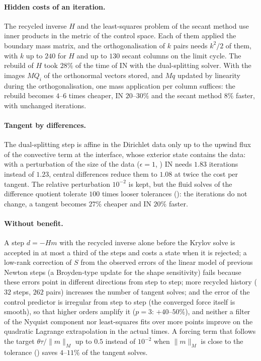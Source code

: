 \documentclass[11pt,a4paper]{article}
\theoremstyle{definition}
\theoremstyle{remark}
\newcommand{\M}{M}
\begin{document}
\paragraph{Hidden costs of an iteration.} The recycled inverse $H$ and the least-squares problem of
the secant method use inner products in the metric of the control space. Each of them applied the
boundary mass matrix, and the orthogonalisation of $k$ pairs needs $k^2/2$ of them, with $k$ up to
$240$ for $H$ and up to $130$ secant columns on the limit cycle. The rebuild of $H$ took $28\%$ of
the time of IN with the dual-splitting solver. With the images $\M Q_i$ of the orthonormal vectors
stored, and $\M q$ updated by linearity during the orthogonalisation, one mass application per
column suffices: the rebuild becomes $4$--$6$ times cheaper, IN $20$--$30\%$ and the secant method
$8\%$ faster, with unchanged iterations.

\paragraph{Tangent by differences.} The dual-splitting step is affine in the Dirichlet data only up
to the upwind flux of the convective term at the interface, whose exterior state contains the data:
with a perturbation of the size of the data ($\epsilon=1$, ) IN needs $1.83$
iterations instead of $1.23$, central differences reduce them to $1.08$ at twice the cost per
tangent. The relative perturbation $10^{-2}$ is kept, but the fluid solves of the difference quotient
tolerate $100$ times looser tolerances (): the iterations do
not change, a tangent becomes $27\%$ cheaper and IN $20\%$ faster.

\paragraph{Without benefit.} A step $d=-Hm$ with the recycled inverse alone before the Krylov solve
is accepted in at most a third of the steps and costs a state when it is rejected; a low-rank
correction of $S$ from the observed errors of the linear model of previous Newton steps (a
Broyden-type update for the shape sensitivity) fails because these errors point in different
directions from step to step; more recycled history ($32$ steps, $262$ pairs) increases the number
of tangent solves; and the error of the control predictor is irregular from step to step (the
converged force itself is smooth), so that higher orders amplify it ($p=3$: $+40$--$50\%$), and neither a
filter of the Nyquist component nor least-squares fits over more points improve on the quadratic
Lagrange extrapolation in the actual times. A forcing term that follows the target $\theta\tau/\|m\|_{\M}$ up to $0.5$
instead of $10^{-2}$ when $\|m\|_{\M}$ is close to the tolerance () saves
$4$--$11\%$ of the tangent solves.
\end{document}
